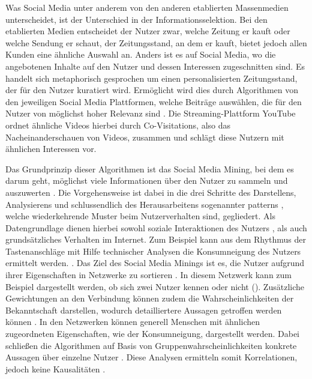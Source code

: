 Was Social Media unter anderem von den anderen etablierten Massenmedien unterscheidet, ist der Unterschied in der Informationsselektion. Bei den etablierten Medien entscheidet der Nutzer zwar, welche Zeitung er kauft oder welche Sendung er schaut, der Zeitungsstand, an dem er kauft, bietet jedoch allen Kunden eine ähnliche Auswahl an. Anders ist es auf Social Media, wo die angebotenen Inhalte auf den Nutzer und dessen Interessen zugeschnitten sind. Es handelt sich metaphorisch gesprochen um einen personalisierten Zeitungsstand, der für den Nutzer kuratiert wird. Ermöglicht wird dies durch Algorithmen von den jeweiligen Social Media Plattformen, welche Beiträge auswählen, die für den Nutzer von möglichst hoher Relevanz sind \autocite[vgl][315]{socialmediamining}. Die Streaming-Plattform YouTube ordnet ähnliche Videos hierbei durch Co-Visitations, also das Nacheinanderschauen von Videos, zusammen und schlägt diese Nutzern mit ähnlichen  Interessen vor.

Das Grundprinzip dieser Algorithmen ist das Social Media Mining, bei dem es darum geht, möglichst viele Informationen über den Nutzer zu sammeln und auszuwerten \autocite[16]{socialmediamining}. Die Vorgehensweise ist dabei in die drei Schritte des Darstellens, Analysierens und schlussendlich des Herausarbeitens sogenannter \glqq patterns\grqq{} \autocite[vgl.][21]{socialmediamining}, welche wiederkehrende Muster beim Nutzerverhalten sind, gegliedert. Als Datengrundlage dienen hierbei sowohl soziale Interaktionen des Nutzers \autocite[vgl.][21]{socialmediamining}, als auch grundsätzliches Verhalten im Internet. Zum Beispiel kann aus dem Rhythmus der Tastenanschläge mit Hilfe technischer Analysen die Konsumneigung des Nutzers ermittelt werden. \autocite[vgl.][S.2]{martini2017algorithmen}. Das Ziel des Social Media Minings ist es, die Nutzer aufgrund ihrer Eigenschaften in Netzwerke zu sortieren \autocite[vgl.][29]{socialmediamining}. In diesem Netzwerk kann zum Beispiel dargestellt werden, ob sich zwei Nutzer kennen oder nicht (\autocite[]{fig:graphNetwork}). Zusätzliche Gewichtungen an den Verbindung können zudem die Wahrscheinlichkeiten der Bekanntschaft darstellen, wodurch detailliertere Aussagen getroffen werden können \autocite[vgl.][66]{socialmediamining}. In den Netzwerken können generell Menschen mit ähnlichen zugeordneten Eigenschaften, wie der Konsumneigung, dargestellt werden. Dabei schließen die Algorithmen auf Basis von Gruppenwahrscheinlichkeiten konkrete Aussagen über einzelne Nutzer \autocite[vgl.][S.4]{martini2017algorithmen}. Diese Analysen ermitteln somit Korrelationen, jedoch keine Kausalitäten \autocite[vgl.][9]{martini2014big}. 

